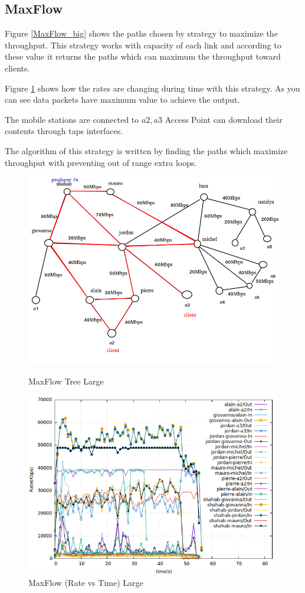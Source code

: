 \subsection{MaxFlow}
Figure \ref{MaxFlow_big} shows the paths chosen by strategy to maximize the throughput. This strategy works with capacity of each link and according to these value it returns the paths which can maximum the throughput toward clients.

Figure \ref{maxflow_big} shows how the rates are changing during time with this strategy. As you can see data packets have maximum value to achieve the output.  

The mobile stations are connected to $a2,a3$ Access Point can download their contents through taps interfaces.

The algorithm of this strategy is written by finding the paths which maximize throughput with preventing out of range extra loops.

\begin{figure}[H]

\begin{center}

\includegraphics[scale = 0.4]{Figures/MaxFlow_big.png}

\caption{MaxFlow Tree Large} \label{MaxFlow_big} 


\includegraphics[scale = 0.4]{Figures/maxflow_big.png}

\caption{MaxFlow (Rate vs Time) Large} \label{maxflow_big} 


\end{center}

\end{figure}



